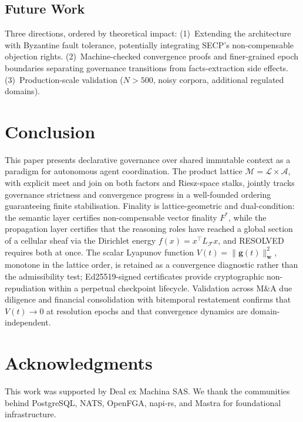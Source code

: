 \documentclass[11pt]{article}
\begin{document}
\subsection{Future Work}

Three directions, ordered by theoretical impact:
(1)~Extending the architecture with Byzantine fault tolerance, potentially integrating SECP's non-compensable objection rights.
(2)~Machine-checked convergence proofs and finer-grained epoch boundaries separating governance transitions from facts-extraction side effects.
(3)~Production-scale validation ($N > 500$, noisy corpora, additional regulated domains).

\section{Conclusion}
\label{sec:conclusion}

This paper presents declarative governance over shared immutable context as a paradigm for autonomous agent coordination.
The product lattice $\mathcal{M} = \mathcal{L} \times \mathcal{A}$, with explicit meet and join on both factors and Riesz-space stalks, jointly tracks governance strictness and convergence progress in a well-founded ordering guaranteeing finite stabilisation.
Finality is lattice-geometric and dual-condition: the semantic layer certifies non-compensable vector finality $F^*$, while the propagation layer certifies that the reasoning roles have reached a global section of a cellular sheaf via the Dirichlet energy $f(x) = x^\top L_{\mathcal{F}} x$, and RESOLVED requires both at once. The scalar Lyapunov function $V(t) = \|\mathbf{g}(t)\|^2_\mathbf{w}$, monotone in the lattice order, is retained as a convergence diagnostic rather than the admissibility test; Ed25519-signed certificates provide cryptographic non-repudiation within a perpetual checkpoint lifecycle.
Validation across M\&A due diligence and financial consolidation with bitemporal restatement confirms that $V(t) \to 0$ at resolution epochs and that convergence dynamics are domain-independent.

\section*{Acknowledgments}
This work was supported by Deal ex Machina SAS. We thank the communities behind PostgreSQL, NATS, OpenFGA, napi-rs, and Mastra for foundational infrastructure.
\end{document}
